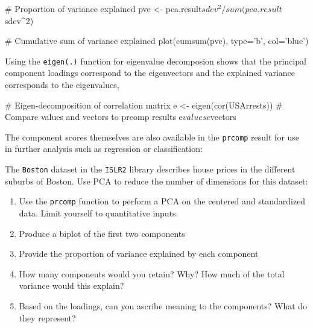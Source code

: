 \begin{Rcode}
# Proportion of variance explained
pve <- pca.result$sdev^2 / sum(pca.result$sdev^2)

# Cumulative sum of variance explained
plot(cumsum(pve), type='b', col='blue')
\end{Rcode}

\noindent Using the \texttt{eigen(.)} function for eigenvalue decomposion shows that the principal component loadings correspond to the eigenvectors and the explained variance corresponds to the eigenvalues, 

\begin{Rcode}
# Eigen-decomposition of correlation matrix
e <- eigen(cor(USArrests))
# Compare values and vectors to prcomp results
e$values
e$vectors
\end{Rcode}


\noindent The component scores themselves are also available in the \texttt{prcomp} result for use in further analysis such as regression or classification:


\begin{exercisebox}

The \texttt{Boston} dataset in the \texttt{ISLR2} library describes house prices in the different suburbs of Boston. Use PCA to reduce the number of dimensions for this dataset:
\begin{enumerate}
   \item Use the \texttt{prcomp} function to perform a PCA on the centered and standardized data. Limit yourself to quantitative inputs.
   \item Produce a biplot of the first two components
   \item Provide the proportion of variance explained by each component
   \item How many components would you retain? Why? How much of the total variance would this explain?
   \item Based on the loadings, can you ascribe meaning to the components? What do they represent?
\end{enumerate}
\end{exercisebox}

